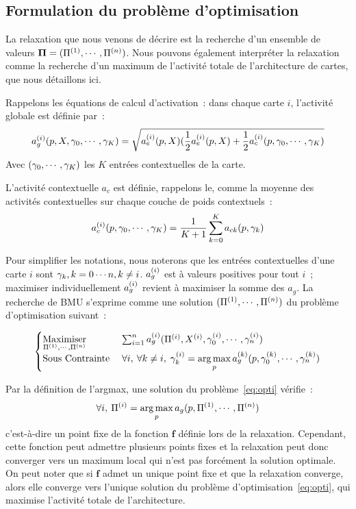 \documentclass[../main]{subfiles}
\begin{document}
\subsection{Formulation du problème d'optimisation}

La relaxation que nous venons de décrire est la recherche d'un ensemble de valeurs $\mathbf{\Pi} = (\Pi^{({1})}, \cdots, \Pi^{({n})})$.
Nous pouvons également interpréter la relaxation comme la recherche d'un maximum de l'activité totale de l'architecture de cartes, que nous détaillons ici. 

Rappelons les équations de calcul d'activation~:
dans chaque carte $i$, l'activité globale est définie par~:
\begin{equation}\label{eq:ag}
	a_g^{({i})}(p, X, \gamma_0, \cdots, \gamma_K) = \sqrt{a_e^{({i})}(p,X)(\frac{1}{2}a_e^{({i})}(p,X) + \frac{1}{2}a_c^{({i})}(p,\gamma_0, \cdots, \gamma_K)}
\end{equation}
Avec $(\gamma_0, \cdots, \gamma_K)$ les $K$ entrées contextuelles de la carte. 

L'activité contextuelle $a_c$ est définie, rappelons le, comme la moyenne des activités contextuelles sur chaque couche de poids contextuels~:
\begin{equation}
	a_c^{({i})}(p, \gamma_0, \cdots, \gamma_K) = \frac{1}{K+1}\sum_{k=0}^{K}{a_{ck}(p, \gamma_k)}
\end{equation}

Pour simplifier les notations, nous noterons que les entrées contextuelles d'une carte $i$ sont ${\gamma_k, k = 0 \cdots n , k \neq i}$.
$a_g^{({i})}$ est à valeurs positives pour tout $i$~; maximiser individuellement $a_g^{({i})}$ revient à maximiser la somme des $a_g$. 
La recherche de BMU s'exprime comme une solution $(\Pi^{({1})}, \cdots, \Pi^{({n})})$ du problème d'optimisation suivant~:

\begin{equation}\label{eq:opti}
	\begin{cases}
	\operatorname*{Maximiser}\limits_{\Pi^{({1})}, \cdots, \Pi^{({n})}}\;& \sum_{i = 1}^n a_g^{({i})}(\Pi^{({i})},X^{({i})},\gamma_0^{({i})}, \cdots, \gamma_n^{({i})}) \\
	\text{Sous Contrainte}\; &\forall i,\:\forall k \neq i, \; \gamma_k^{({i})} = \operatorname*{arg\,max}\limits_p a_g^{({k})}(p,\gamma_0^{({k})}, \cdots, \gamma_n^{({k})})
	\end{cases}
\end{equation}

Par la définition de l'argmax, une solution du problème~\ref{eq:opti} vérifie~:
$$\forall i, \: \Pi^{({i})} = \operatorname*{arg\,max}_p a_g(p, \Pi^{({1})}, \cdots, \Pi^{({n})})$$
c'est-à-dire un point fixe de la fonction $\mathbf{f}$ définie lors de la relaxation.
Cependant, cette fonction peut admettre plusieurs points fixes et la relaxation peut donc converger vers un maximum local qui n'est pas forcément la solution optimale.
On peut noter que si $\mathbf{f}$ admet un unique point fixe et que la relaxation converge, alors elle converge vers l'unique solution du problème d'optimisation~\ref{eq:opti}, qui maximise l'activité totale de l'architecture.
\end{document}
